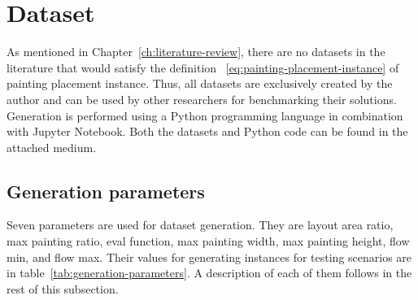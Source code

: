 \section{Dataset}\label{sec:dataset}

As mentioned in Chapter~\ref{ch:literature-review}, there are no datasets in the
literature that would satisfy the definition ~\ref{eq:painting-placement-instance} of painting placement instance.
Thus, all datasets are exclusively created by the author and can be used by other researchers
for benchmarking their solutions.
Generation is performed using a Python programming language in combination with Jupyter Notebook.
Both the datasets and Python code can be found in the attached medium.

\subsection{Generation parameters}\label{subsec:generation-parameters}

Seven parameters are used for dataset generation.
They are layout area ratio, max painting ratio, eval function, max painting width, max painting height, flow min, and flow max.
Their values for generating instances for testing scenarios are in table~\ref{tab:generation-parameters}.
A description of each of them follows in the rest of this subsection.

